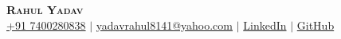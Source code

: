 
\begin{center}
    \textbf{\Huge \scshape Rahul Yadav} \\ \vspace{3pt}
    \small
    \faMobile \hspace{.5pt} \href{tel:917400280838}{+91 7400280838}
    $|$
    \faAt \hspace{.5pt} \href{mailto:yadavrahul8141@yahoo.com}{yadavrahul8141@yahoo.com}
    $|$
    \faLinkedinSquare \hspace{.5pt} \href{https://www.linkedin.com/in/yadavrahul8141}{LinkedIn}
    $|$
    \faGithub \hspace{.5pt} \href{https://github.com/rahul007-bit}{GitHub}
\end{center}
